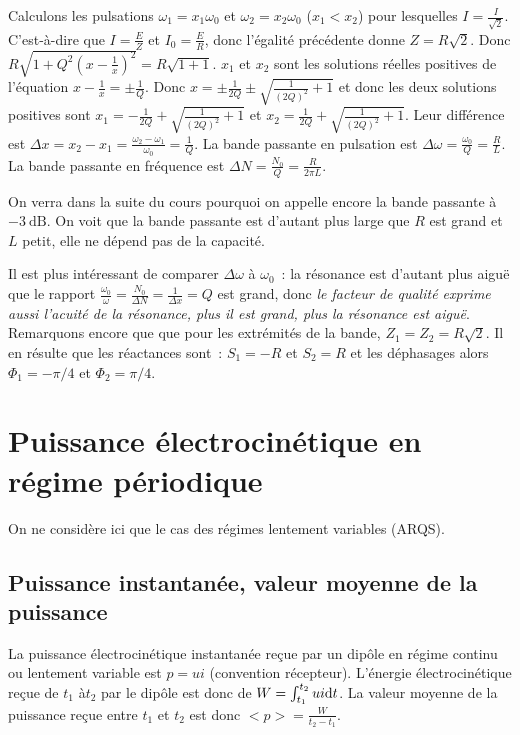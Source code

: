 		Calculons les pulsations $\omega_1 = x_1 \omega_0$ et $\omega_2 = x_2 \omega_0$ ($x_1<x_2$) pour lesquelles $I = \frac{I}{\sqrt{2}}$. C'est-à-dire que $I = \frac{E}{Z}$ et $I_0 = \frac{E}{R}$, donc l'égalité précédente donne $Z = R\sqrt{2}$. Donc $R\sqrt{1+Q^2\left(x-\frac{1}{x}\right)^2} = R\sqrt{1+1}$. $x_1$ et $x_2$ sont les solutions réelles positives de l'équation $x -\frac{1}{x} = \pm \frac{1}{Q}$. Donc $x = \pm\frac{1}{2Q} \pm \sqrt{\frac{1}{(2Q)^2} +1}$ et donc les deux solutions positives sont $x_1 = -\frac{1}{2Q} + \sqrt{\frac{1}{(2Q)^2} +1}$ et $x_2 = \frac{1}{2Q} + \sqrt{\frac{1}{(2Q)^2} +1}$. Leur différence est $\Delta x = x_2-x_1 = \frac{\omega_2 -\omega_1}{\omega_0} = \frac{1}{Q}$. La bande passante en pulsation est $\Delta \omega = \frac{\omega_0}{Q}=\frac{R}{L}$. La bande passante en fréquence est $\Delta N = \frac{N_0}{Q}=\frac{R}{2\pi L}$.
		
		On verra dans la suite du cours pourquoi on appelle encore la bande passante à $\SI{-3}{\dB}$. On voit que la bande passante est d'autant plus large que $R$ est grand et $L$ petit, elle ne dépend pas de la capacité.
		
		Il est plus intéressant de comparer $\Delta \omega$ à $\omega_0$~: la résonance est d'autant plus aiguë que le rapport $\frac{\omega_0}{\omega} = \frac{N_0}{\Delta N} = \frac{1}{\Delta x} = Q$ est grand, donc \emph{le facteur de qualité exprime aussi l'acuité de la résonance, plus il est grand, plus la résonance est aiguë}. Remarquons encore que que pour les extrémités de la bande, $Z_1=Z_2=R\sqrt{2}$. Il en résulte que les réactances sont~: $S_1=-R$ et $S_2=R$ et les déphasages alors $\Phi_1=-\pi/4$ et $\Phi_2 =\pi/4$.
		
\section{Puissance électrocinétique en régime périodique}
	On ne considère ici que le cas des régimes lentement variables (ARQS).
	\subsection{Puissance instantanée, valeur moyenne de la puissance}
		La puissance électrocinétique instantanée reçue par un dipôle en régime continu ou lentement variable est $p = ui$ (convention récepteur). L'énergie électrocinétique reçue de $t_1$ à$t_2$ par le dipôle est donc de $W = \int_{t_1}^{t_2} ui \mathrm{d} t$. La valeur moyenne de la puissance reçue entre $t_1$ et $t_2$ est donc $<p> = \frac{W}{t_2 - t_1}$.

